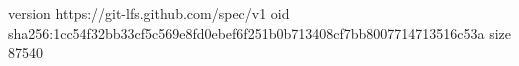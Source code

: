 version https://git-lfs.github.com/spec/v1
oid sha256:1cc54f32bb33cf5c569e8fd0ebef6f251b0b713408cf7bb8007714713516c53a
size 87540
